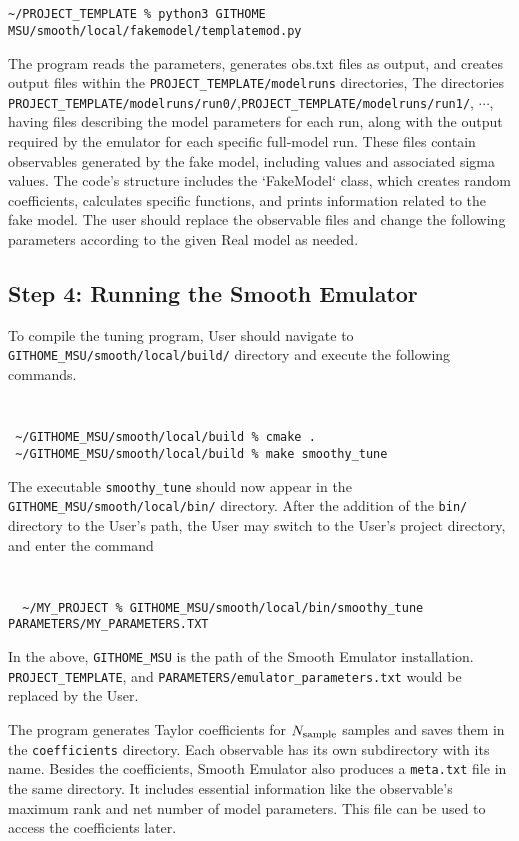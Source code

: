 \documentclass[main.tex]{subfiles}
\begin{document}
\
\vspace{-20pt}
{\tt
\begin{verbatim}
~/PROJECT_TEMPLATE % python3 GITHOME MSU/smooth/local/fakemodel/templatemod.py
\end{verbatim}
}
The program reads the parameters, generates obs.txt files as output, and creates output files within the {\tt PROJECT\_TEMPLATE/modelruns} directories, The directories
{\tt  PROJECT\_TEMPLATE/modelruns/run0/},{\tt  PROJECT\_TEMPLATE/modelruns/run1/}, $\cdots$, having files describing the model parameters for each run, along with the output required by the emulator for each specific full-model run. These files contain observables generated by the fake model, including values and associated sigma values. The code's structure includes the `FakeModel` class, which creates random coefficients, calculates specific functions, and prints information related to the fake model. The user should replace the observable files and change the following parameters according to the given Real model as needed.


\subsection{Step 4: Running the Smooth Emulator}
To compile the tuning program, User should navigate to {\tt GITHOME\_MSU/smooth/local/build/} directory and execute the following commands.
{\tt
\begin{verbatim}
 ~/GITHOME_MSU/smooth/local/build % cmake .
 ~/GITHOME_MSU/smooth/local/build % make smoothy_tune
\end{verbatim}
}
The executable {\tt smoothy\_tune} should now appear in the {\tt GITHOME\_MSU/smooth/local/bin/} directory. After the addition of the {\tt bin/} directory to the User's path, the User may switch to the User's project directory, and enter the command
{\tt
\begin{verbatim}
  ~/MY_PROJECT % GITHOME_MSU/smooth/local/bin/smoothy_tune PARAMETERS/MY_PARAMETERS.TXT
\end{verbatim}
}
In the above, {\tt GITHOME\_MSU} is the path of the Smooth Emulator installation. {\tt PROJECT\_TEMPLATE}, and {\tt PARAMETERS/emulator\_parameters.txt} would be replaced by the User.

The program generates Taylor coefficients for $N_{\rm sample}$ samples and saves them in the {\tt coefficients} directory. Each observable has its own subdirectory with its name. Besides the coefficients, Smooth Emulator also produces a {\tt meta.txt} file in the same directory. It includes essential information like the observable's maximum rank and net number of model parameters. This file can be used to access the coefficients later.
\end{document}
